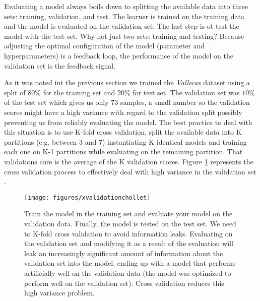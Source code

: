 \documentclass[11pt]{article}
\theoremstyle{definition}
\theoremstyle{remark}
\begin{document}
Evaluating a model always boils down to splitting the available data into three sets: training, validation, and test. The learner is  trained on the training data and the model is evaluated on the validation set. The last step is ot test the model with the test set.  
Why not just two sets: training and testing? Because adjusting the optimal configuration of the model (parameter and hyperparameters) is a feedback loop, the performance of the model on the validation set is the feedback signal.


As it was noted int the previous section we trained the \emph{Vallecas} dataset using a split of $80\%$ for the training set and $20\%$ for test set. The validation set was $10\%$ of the test set which gives us only 73 samples, a small number so the validation scores might have a high variance with regard to the validation split possibly preventing us from reliably evaluating the model. The best practice to deal with this situation is to use K-fold cross validation, split the available data into K partitions (e.g. between 3 and 7) instantiating K identical models and training each one on K-1 partitions while evaluating on the remaining partition. That validations core is the average of the K validation scores. Figure \ref{fig:xvalchollet} represents the cross validation process to effectively deal with high variance in the validation set \cite{chollet2017deep}. 
\begin{figure}[H]
        \centering
        \texttt{[image: figures/xvalidationchollet]}
        \caption{Train the model in the training set and evaluate your model on the validation data. Finally, the model is tested on the test set. We need to K-fold cross validation to avoid information leaks. Evaluating on the validation set and modifying it as a result of the evaluation will leak an increasingly significant amount of information about the validation set into the model, ending up with a model that performs artificially well on the validation data (the model was optimized to perform well on the validation set). Cross validation reduces this high variance problem.} \label{fig:xvalchollet}
\end{figure}
\end{document}
